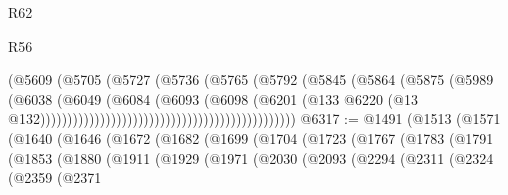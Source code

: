 \begin{lexlean}{R62}
\begin{lexlean}{R56}
\begin{coremodule}
{{{{{{{{{{{{{{{{{{{{{{{{{{{{{{{{{{{{{{{{{{{{{{{{{{{{{{{{{{{{{{{{{{{{{{{{{{{{{{{{{{{{{{{{{{{{{{{{{{{{{{{{{{{{{{{{{{{{{{{{{{{{{{{{{{{{{{{{{{{{{{{{{{{{{{{{{{{{{{{{{{{{{{{{{{{{{{{{{{{{{{{{{{{{{{{{{{{{{{{{{{{{{{{{{{{                                                              (@5609
                                                                (@5705
                                                                  (@5727
                                                                    (@5736
                                                                      (@5765
                                                                        (@5792
                                                                          (@5845
                                                                            (@5864
                                                                              (@5875
                                                                                (@5989
                                                                                  (@6038
                                                                                    (@6049
                                                                                      (@6084
                                                                                        (@6093
                                                                                          (@6098
                                                                                            (@6201
                                                                                              (@133
                                                                                                @6220
                                                                                                (@13
                                                                                                  @132)))))))))))))))))))))))))))))))))))))))))))))))
@6317 := @1491
    (@1513
      (@1571
        (@1640
          (@1646
            (@1672
              (@1682
                (@1699
                  (@1704
                    (@1723
                      (@1767
                        (@1783
                          (@1791
                            (@1853
                              (@1880
                                (@1911
                                  (@1929
                                    (@1971
                                      (@2030
                                        (@2093
                                          (@2294
                                            (@2311
                                              (@2324
                                                (@2359
                                                  (@2371
}}}}}}}}}}}}}}}}}}}}}}}}}}}}}}}}}}}}}}}}}}}}}}}}}}}}}}}}}}}}}}}}}}}}}}}}}}}}}}}}}}}}}}}}}}}}}}}}}}}}}}}}}}}}}}}}}}}}}}}}}}}}}}}}}}}}}}}}}}}}}}}}}}}}}}}}}}}}}}}}}}}}}}}}}}}}}}}}}}}}}}}}}}}}}}}}}}}}}}}}}}}}}}}}}}}
\end{coremodule}
\end{lexlean}
\end{lexlean}
